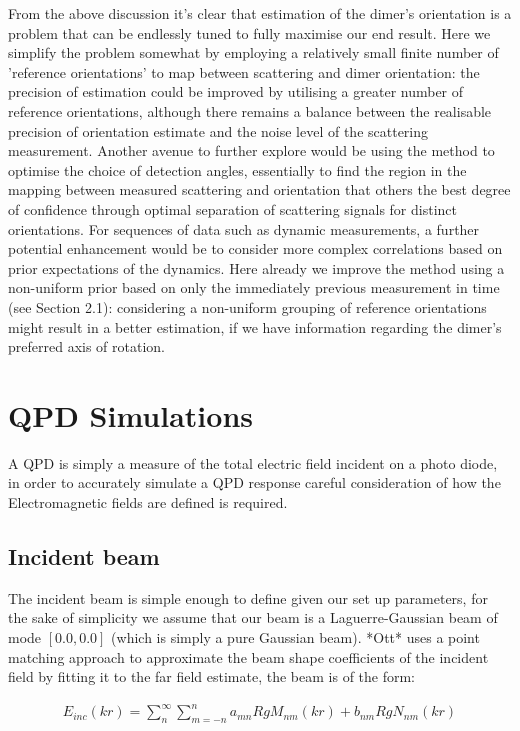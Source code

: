 From the above discussion it’s clear that estimation of the dimer’s orientation is a problem that can be endlessly tuned to fully maximise our end result. Here we simplify the problem somewhat by employing a relatively small finite number of 'reference orientations' to map between scattering and dimer orientation: the precision of estimation could be improved by utilising a greater number of reference orientations, although there remains a balance between the realisable precision of orientation estimate and the noise level of the scattering measurement. Another avenue to further explore would be using the method to optimise the choice of detection angles, essentially to find the region in the mapping between measured scattering and orientation that others the best degree of confidence through optimal separation of scattering signals for distinct orientations. For sequences of data such as dynamic measurements, a further potential enhancement would be to consider more complex correlations based on prior expectations of the dynamics. Here already we improve the method using a non-uniform prior based on only the immediately previous measurement in time (see Section 2.1): considering a non-uniform grouping of reference orientations might result in a better estimation, if we have information regarding the dimer’s preferred axis of rotation. 



\section{QPD Simulations}
A QPD is simply a measure of the total electric field incident on a photo diode, in order to accurately simulate a QPD response careful consideration of how the Electromagnetic fields are defined is required. 

\subsection{Incident beam}
\label{sec:fibre_scattering}
The incident beam is simple enough to define given our set up parameters, for the sake of simplicity we assume that our beam is a Laguerre-Gaussian beam of mode $[0.0, 0.0]$ (which is simply a pure Gaussian beam). *Ott* uses a point matching approach to approximate the beam shape coefficients of the incident field by fitting it to the far field estimate, the beam is of the form:

\begin{align}
	E_{inc}(kr)=\sum^\infty_n\sum^n_{m=-n}a_{mn}RgM_{nm}(kr)+b_{nm}RgN_{nm}(kr)
\end{align}

